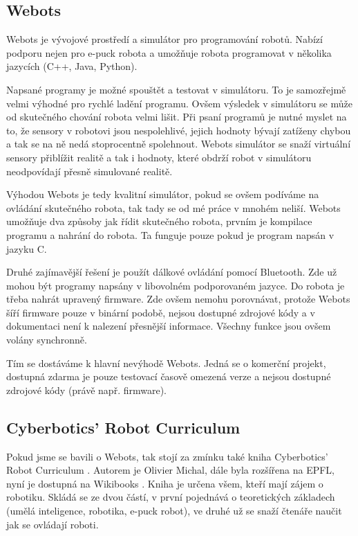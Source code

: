 \documentclass[12pt,notitlepage]{report}
\begin{document}
        \subsection{Webots}
        \label{webots}

        Webots \cite{webots} je vývojové prostředí a simulátor pro programování robotů.
        Nabízí podporu nejen pro e-puck robota a umožňuje robota programovat v
        několika jazycích (C++, Java, Python).

        Napsané programy je možné spouštět a testovat v simulátoru. To je
        samozřejmě velmi výhodné pro rychlé ladění programu. Ovšem výsledek v
        simulátoru se může od skutečného chování robota velmi lišit. Při psaní
        programů je nutné myslet na to, že sensory v robotovi jsou
        nespolehlivé, jejich hodnoty bývají zatíženy chybou a tak se na ně nedá
        stoprocentně spolehnout. Webots simulátor se snaží virtuální sensory
        přiblížit realitě a tak i hodnoty, které obdrží robot v simulátoru
        neodpovídají přesně simulované realitě.

        Výhodou Webots je tedy kvalitní simulátor, pokud se ovšem podíváme na
        ovládání skutečného robota, tak tady se od mé práce v mnohém neliší.
        Webots umožňuje dva způsoby jak řídit skutečného robota, prvním je
        kompilace programu a nahrání do robota. Ta funguje pouze pokud je
        program napsán v jazyku C.

        Druhé zajímavější řešení je použít dálkové ovládání pomocí
        Bluetooth. Zde už mohou být programy napsány v libovolném podporovaném
        jazyce. Do robota je třeba nahrát upravený firmware. Zde ovšem nemohu
        porovnávat, protože Webots šíří firmware pouze v binární podobě, nejsou
        dostupné zdrojové kódy a v dokumentaci není k nalezení přesnější
        informace. Všechny funkce jsou ovšem volány synchronně.

        Tím se dostáváme k hlavní nevýhodě Webots. Jedná se o komerční projekt,
        dostupná zdarma je pouze testovací časově omezená verze a nejsou
        dostupné zdrojové kódy (právě např. firmware).

        \subsection{Cyberbotics' Robot Curriculum}
        \label{curriculum}

        Pokud jsme se bavili o Webots, tak stojí za zmínku také kniha
        Cyberbotics' Robot Curriculum \cite{cyberbotics}. Autorem je Olivier
        Michal, dále byla rozšířena na EPFL, nyní je dostupná na
        Wikibooks \cite{wikibooks}. Kniha je určena všem, kteří mají zájem o
        robotiku. Skládá se ze dvou částí, v první pojednává o teoretických
        základech (umělá inteligence, robotika, e-puck robot), ve druhé už se
        snaží čtenáře naučit jak se ovládají roboti.
\end{document}
